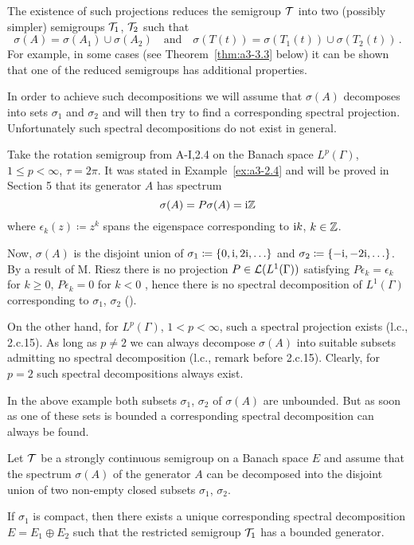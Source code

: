 The existence of such projections reduces the semigroup $\mathcal{T}$ into two (possibly simpler) semigroups $\mathcal{T}_{1}$, $\mathcal{T}_{2}$ such that
\[
\sigma(A) = \sigma(A_{1}) \cup \sigma(A_{2}) \quad \text{and} \quad \sigma(T(t)) = \sigma(T_{1}(t)) \cup \sigma(T_{2}(t))\,.
\]
For example, in some cases (see Theorem~\ref{thm:a3-3.3} below) it can be shown that one of the reduced semigroups has additional properties.

In order to achieve such decompositions we will assume that $\sigma(A)$ decomposes into sets $\sigma_{1}$ and $\sigma_{2}$ and will then try to find a corresponding spectral projection.
Unfortunately such spectral decompositions do not exist in general.
\begin{example}\label{ex:a3-3.2}
Take the rotation semigroup from A-I,2.4 on the Banach space $L^{p}(\Gamma)$, $1 \leq p < \infty$, $\tau = 2\pi$.
It was stated in Example~\ref{ex:a3-2.4} and will be proved in Section 5 that its generator $A$ has spectrum
\[
\sigma(A) = P\sigma(A) = \mathrm{i}\mathbb{Z}
\]
where $\epsilon_{k}(z) \coloneqq z^{k}$ spans the eigenspace corresponding to $\mathrm{i} k$, $k \in \mathbb{Z}$.

Now, $\sigma(A)$ is the disjoint union of 
$\sigma_{1} \coloneqq \{0,\mathrm{i} ,2\mathrm{i}, \ldots\}$ 
and $\sigma_{2} \coloneqq \{-\mathrm{i}, -2\mathrm{i}, \ldots\}$.
By a result of M. Riesz there is no projection $P \in \mathcal{L}(L^{1}(\Gamma))$ satisfying $P\epsilon_{k} = \epsilon_{k}$ for $k \geq 0$, $P\epsilon_{k} = 0$ for $k < 0$ , hence there is no spectral decomposition of $L^{1}(\Gamma)$ corresponding to $\sigma_{1}$, $\sigma_{2}$ (\citet[p.165]{lindenstraustzafriri:1979}).

On the other hand, for $L^{p}(\Gamma)$, $1 < p < \infty$, such a spectral projection exists (l.c., 2.c.15).
As long as $p \neq 2$ we can always decompose $\sigma(A)$ into suitable subsets admitting no spectral decomposition (l.c., remark before 2.c.15).
Clearly, for $p = 2$ such spectral decompositions always exist.
\end{example}
In the above example both subsets $\sigma_{1}$, $\sigma_{2}$ of $\sigma(A)$ are unbounded.
But as soon as one of these sets is bounded a corresponding spectral decomposition can always be found.
\begin{theorem}\label{thm:a3-3.3}
Let $\mathcal{T}$ be a strongly continuous semigroup on a Banach space $E$ and assume that the spectrum $\sigma(A)$ of the generator $A$ can be decomposed into the disjoint union of two non-empty closed subsets $\sigma_{1}$, $\sigma_{2}$.

If $\sigma_{1}$ is compact, then there exists a unique corresponding spectral decomposition $E = E_{1} \oplus E_{2}$ such that the restricted semigroup $\mathcal{T}_{1}$ has a bounded generator.
\end{theorem}
